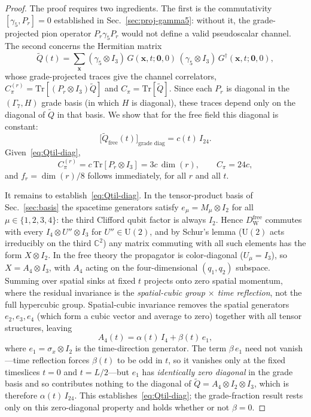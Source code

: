 \documentclass[12pt]{article}
\theoremstyle{definition}
\theoremstyle{remark}
\newcommand{\tr}{\mathrm{Tr}}           %
\newcommand{\dW}{D_{\mathrm{W}}}        %
\newcommand{\GaSeven}{\Gamma_7}                      %
\newcommand{\Qtil}{\widetilde{Q}}                    %
\begin{document}
	\begin{proof}
		The proof requires two ingredients.  The first is the commutativity
		$[\gamma_5, P_r]=0$ established in Sec.~\ref{sec:proj-gamma5}: without it,
		the grade-projected pion operator $P_r\gamma_5 P_r$ would not define a valid
		pseudoscalar channel.  The second concerns the Hermitian matrix
		\begin{equation}
			\Qtil(t) = \sum_{\mathbf{x}}(\gamma_5\otimes I_3)\,
			G(\mathbf{x},t;\mathbf{0},0)\,(\gamma_5\otimes I_3)\,
			G^\dagger(\mathbf{x},t;\mathbf{0},0),
			\label{eq:Qtil-def}
		\end{equation}
		whose grade-projected traces give the channel correlators,
		$C_\pi^{(r)} = \tr[(P_r\otimes I_3)\Qtil]$ and $C_\pi = \tr[\Qtil]$.  Since
		each $P_r$ is diagonal in the $(\GaSeven,H)$ grade basis (in which $H$ is
		diagonal), these traces depend only on the diagonal of $\Qtil$ in that
		basis.  We show that for the free field this diagonal is constant:
		\begin{equation}
			\bigl[\Qtil_{\mathrm{free}}(t)\bigr]_{\text{grade diag}} = c(t)\,I_{24}.
			\label{eq:Qtil-diag}
		\end{equation}
		Given~\eqref{eq:Qtil-diag},
		\[
		C_\pi^{(r)} = c\,\tr[P_r\otimes I_3] = 3c\,\dim(r),
		\qquad
		C_\pi = 24c,
		\]
		and $f_r = \dim(r)/8$ follows immediately, for all $r$ and all $t$.
		
		It remains to establish~\eqref{eq:Qtil-diag}.  In the tensor-product basis
		of Sec.~\ref{sec:basis} the spacetime generators satisfy
		$e_\mu = M_\mu\otimes I_2$ for all $\mu\in\{1,2,3,4\}$: the third Clifford
		qubit factor is always $I_2$.  Hence $\dW^{\mathrm{free}}$ commutes with
		every $I_4\otimes U''\otimes I_3$ for $U''\in\mathrm{U}(2)$, and by Schur's
		lemma ($\mathrm{U}(2)$ acts irreducibly on the third $\mathbb{C}^2$) any
		matrix commuting with all such elements has the form $X\otimes I_2$.  In the
		free theory the propagator is color-diagonal ($U_\mu=I_3$), so
		$X = A_4\otimes I_3$, with $A_4$ acting on the four-dimensional $(q_1,q_2)$
		subspace.  Summing over spatial sinks at fixed $t$ projects onto zero spatial
		momentum, where the residual invariance is the \emph{spatial-cubic group
		$\times$ time reflection}, not the full hypercubic group.  Spatial-cubic
		invariance removes the spatial generators $e_2,e_3,e_4$ (which form a cubic
		vector and average to zero) together with all tensor structures, leaving
		\begin{equation}
			A_4(t) = \alpha(t)\,I_4 + \beta(t)\,e_1,
			\label{eq:A4-form}
		\end{equation}
		where $e_1=\sigma_x\otimes I_2$ is the time-direction generator.  The term
		$\beta\,e_1$ need not vanish---time reflection forces $\beta(t)$ to be odd
		in $t$, so it vanishes only at the fixed timeslices $t=0$ and $t=L/2$---but
		$e_1$ has \emph{identically zero diagonal} in the grade basis and so
		contributes nothing to the diagonal of $\Qtil = A_4\otimes I_2\otimes I_3$,
		which is therefore $\alpha(t)\,I_{24}$.  This
		establishes~\eqref{eq:Qtil-diag}; the grade-fraction result rests only on
		this zero-diagonal property and holds whether or not $\beta=0$.
		

\end{proof}
\end{document}
